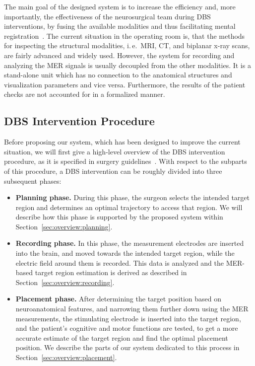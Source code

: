 \documentclass{vgtc}                          %
\begin{document}
The main goal of the designed system is to increase the efficiency and, more importantly, the effectiveness of the neurosurgical team during DBS interventions, by fusing the available modalities and thus facilitating mental registration~\cite{Tory1998}. The current situation in the operating room is, that the methods for inspecting the structural modalities, i.\,e.~MRI, CT, and biplanar x-ray scans, are fairly advanced and widely used. However, the system for recording and analyzing the MER signals is usually decoupled from the other modalities. It is a stand-alone unit which has no connection to the anatomical structures and visualization parameters and vice versa. Furthermore, the results of the patient checks are not accounted for in a formalized manner.


\subsection{DBS Intervention Procedure}\label{sec:overview:procedure}
Before proposing our system, which has been designed to improve the current situation, we will first give a high-level overview of the DBS intervention procedure, as it is specified in surgery guidelines~\cite{Hemm2010}. With respect to the subparts of this procedure, a DBS intervention can be roughly divided into three subsequent phases:

\begin{itemize}
\item \textbf{Planning phase.} During this phase, the surgeon selects the intended target region and determines an optimal trajectory to access that region. We will describe how this phase is supported by the proposed system within Section~\ref{sec:overview:planning}.
\item \textbf{Recording phase.} In this phase, the measurement electrodes are inserted into the brain, and moved towards the intended target region, while the electric field around them is recorded. This data is analyzed and the MER-based target region estimation is derived as described in Section~\ref{sec:overview:recording}.
\item \textbf{Placement phase.} After determining the target position based on neuroanatomical features, and narrowing them further down using the MER measurements, the stimulating electrode is inserted into the target region, and the patient's cognitive and motor functions are tested, to get a more accurate estimate of the target region and find the optimal placement position. We describe the parts of our system dedicated to this process in Section~\ref{sec:overview:placement}.
\end{itemize}
\end{document}
